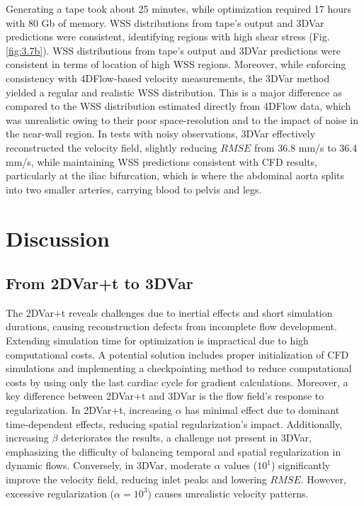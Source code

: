 Generating a tape took about 25 minutes, while optimization required 17 hours with 80 Gb of memory. WSS distributions from tape's output and 3DVar predictions were consistent, identifying regions with high shear stress (Fig. \ref{fig:3.7b}). WSS distributions from tape's output and 3DVar predictions were consistent in terms of location of high WSS regions. Moreover, while enforcing consistency with 4DFlow-based velocity measurements, the 3DVar method yielded a regular and realistic WSS distribution. This is a major difference as compared to the WSS distribution estimated directly from 4DFlow data, which was unrealistic owing to their poor space-resolution and to the impact of noise in the near-wall region. In tests with noisy observations, 3DVar effectively reconstructed the velocity field, slightly reducing \(RMSE\) from 36.8 mm/s to 36.4 mm/s, while maintaining WSS predictions consistent with CFD results, particularly at the iliac bifurcation, which is where the abdominal aorta splits into two smaller arteries, carrying blood to pelvis and legs.


\section*{Discussion}

\subsection*{From 2DVar+t to 3DVar}
The 2DVar+t reveals challenges due to inertial effects and short simulation durations, causing reconstruction defects from incomplete flow development. Extending simulation time for optimization is impractical due to high computational costs. A potential solution includes proper initialization of CFD simulations and implementing a checkpointing method to reduce computational costs by using only the last cardiac cycle for gradient calculations.
Moreover, a key difference between 2DVar+t and 3DVar is the flow field's response to regularization. In 2DVar+t, increasing $\alpha$ has minimal effect due to dominant time-dependent effects, reducing spatial regularization's impact. Additionally, increasing $\beta$ deteriorates the results, a challenge not present in 3DVar, emphasizing the difficulty of balancing temporal and spatial regularization in dynamic flows. Conversely, in 3DVar, moderate $\alpha$ values ($10^{1}$) significantly improve the velocity field, reducing inlet peaks and lowering \(RMSE\). However, excessive regularization ($\alpha = 10^{3}$) causes unrealistic velocity patterns. 

